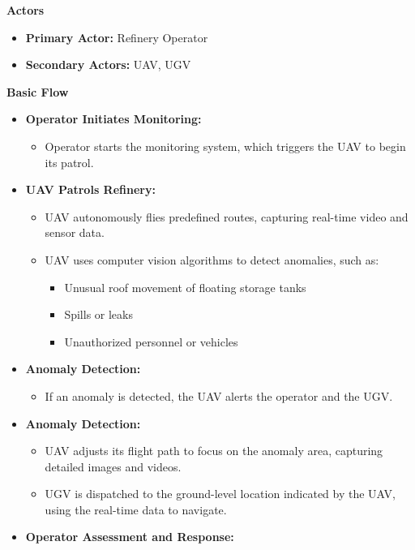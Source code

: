 \textbf{\Large Actors}
\begin{itemize}
    \item \textbf{Primary Actor:} Refinery Operator
    \item \textbf{Secondary Actors:} UAV, UGV
\end{itemize}

\textbf{\Large Basic Flow}
\begin{itemize}
    \item \textbf{Operator Initiates Monitoring:}
    \begin{itemize}
        \item Operator starts the monitoring system, which triggers the UAV to begin its patrol.
    \end{itemize}
    \item \textbf{UAV Patrols Refinery:}
    \begin{itemize}
        \item UAV autonomously flies predefined routes, capturing real-time video and sensor data.
        \item UAV uses computer vision algorithms to detect anomalies, such as:
        \begin{itemize}
            \item Unusual roof movement of floating storage tanks
            \item Spills or leaks
            \item Unauthorized personnel or vehicles
        \end{itemize}
    \end{itemize}
    \item \textbf{Anomaly Detection:}
    \begin{itemize}
        \item If an anomaly is detected, the UAV alerts the operator and the UGV.
    \end{itemize}
    \item \textbf{Anomaly Detection:}
    \begin{itemize}
        \item UAV adjusts its flight path to focus on the anomaly area, capturing detailed images and videos.
        \item UGV is dispatched to the ground-level location indicated by the UAV, using the real-time data to navigate.
    \end{itemize}
    \item \textbf{Operator Assessment and Response:}

\end{itemize}
